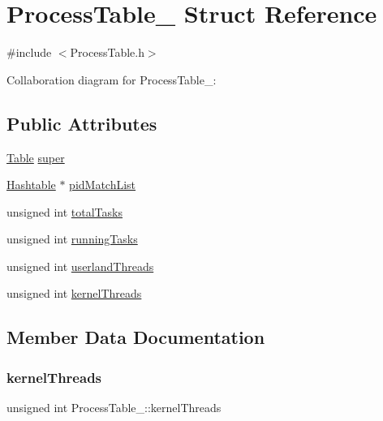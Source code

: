 \hypertarget{structProcessTable__}{}\section{Process\+Table\+\_\+ Struct Reference}
\label{structProcessTable__}


{\ttfamily \#include $<$Process\+Table.\+h$>$}



Collaboration diagram for Process\+Table\+\_\+\+:
\subsection*{Public Attributes}
\begin{DoxyCompactItemize}
\item 
\hyperlink{Table_8h_a799795dd983fdfee2e48cc52cdceb05d}{Table} \hyperlink{structProcessTable___a236998fd6548dc6217aeaa9d9af8869d}{super}
\item 
\hyperlink{Hashtable_8h_af67f943dab16c5d7d465c18053edf47f}{Hashtable} $\ast$ \hyperlink{structProcessTable___a59c9c13efd1aea88e9c403d97b4d681e}{pid\+Match\+List}
\item 
unsigned int \hyperlink{structProcessTable___aed18416b27c9d152653e0663d50b5bac}{total\+Tasks}
\item 
unsigned int \hyperlink{structProcessTable___a29cf0383c0f2515edc9ea6765366112e}{running\+Tasks}
\item 
unsigned int \hyperlink{structProcessTable___ad891156131ecad5a8e3582b573d5cfe4}{userland\+Threads}
\item 
unsigned int \hyperlink{structProcessTable___afe023ad98035b1b335faae8ac1524105}{kernel\+Threads}
\end{DoxyCompactItemize}


\subsection{Member Data Documentation}
\mbox{\label{structProcessTable___afe023ad98035b1b335faae8ac1524105}} 
\subsubsection{\texorpdfstring{kernel\+Threads}{kernelThreads}}
{\footnotesize\ttfamily unsigned int Process\+Table\+\_\+\+::kernel\+Threads}

